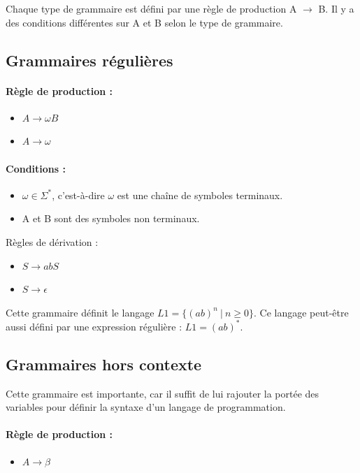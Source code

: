 Chaque type de grammaire est défini par une règle de production A $\rightarrow
$ B. Il y a des conditions différentes sur A et B selon le type de
grammaire.

\subsection{Grammaires régulières}
\paragraph{Règle de production :}
\begin{itemize}
	\item $A \rightarrow \omega B$
	\item $A \rightarrow \omega$
\end{itemize}

\paragraph{Conditions :}
\begin{itemize}
	\item  $\omega \in \Sigma^*$, c'est-à-dire $\omega$ est une chaîne de symboles
	terminaux.
	\item A et B sont des symboles non terminaux.
\end{itemize}

\begin{myexem} Règles de dérivation :
\begin{itemize}
\item $S \rightarrow abS$
\item $S \rightarrow \epsilon$
\end{itemize}
Cette grammaire définit le langage $L1 =
\{(ab)^n \ | \ n \geq 0\}$. Ce langage peut-être aussi défini par une expression
	régulière : $L1 = (ab)^*$.
\end{myexem}

\subsection{Grammaires hors contexte}
Cette grammaire est importante, car il suffit de lui rajouter la portée des
variables pour définir la syntaxe d'un langage de programmation.

\paragraph{Règle de production :}
\begin{itemize}
	\item $A \rightarrow \beta$
\end{itemize}

